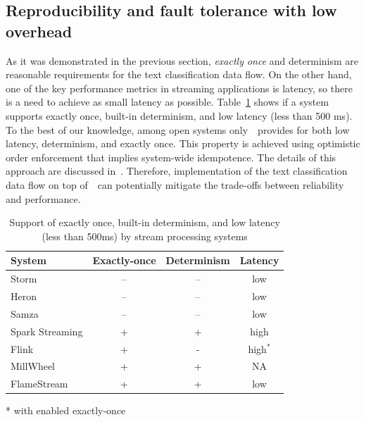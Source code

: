 \label {fs-solution}

\subsection{Reproducibility and fault tolerance with low overhead}

As it was demonstrated in the previous section, {\em exactly once} and determinism are reasonable requirements for the text classification data flow. On the other hand, one of the key performance metrics in streaming applications is latency, so there is a need to achieve as small latency as possible. Table~\ref{comparison} shows if a system supports exactly once, built-in determinism, and low latency (less than 500 ms). To the best of our knowledge, among open systems only~\FlameStream\ provides for both low latency, determinism, and exactly once. This property is achieved using optimistic order enforcement that implies system-wide idempotence. The details of this approach are discussed in~\cite{we2018adbis, we2018beyondmr, we2018seim}. Therefore, implementation of the text classification data flow on top of~\FlameStream\ can potentially mitigate the trade-offs between reliability and performance.

\begin{table}[htbp]
\caption{Support of exactly once, built-in determinism, and low latency (less than 500ms) by stream processing systems}
\begin{threeparttable}
\begin{tabular}{lccc}
System & Exactly-once & Determinism & Latency    \\
\hline
Storm  &    --      &   --       &   low            \\
Heron  &    --      &   --       &   low            \\
Samza  &    --      &   --       &   low            \\
Spark Streaming    &    +       &   +        &   high           \\
Flink              &    +       &   -        &   high$^*$       \\
MillWheel          &    +       &   +        &   NA             \\
FlameStream        &    +       &   +        &   low            \\
\end{tabular}
* with enabled exactly-once~\cite{we2018beyondmr}
\end{threeparttable}
\label{comparison}
\end{table}

